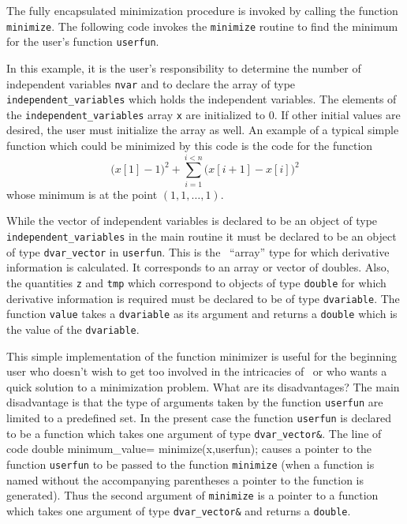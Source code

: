 \documentclass[12pt]{book}
\begin{document}
The fully encapsulated minimization procedure is invoked by calling the
function {\tt minimize}. 
The following code invokes the {\tt minimize} routine
to find the minimum for the user's function {\tt userfun}.
\bigskip
{}

In this example, it is the user's responsibility to determine the
number of independent variables {\tt nvar} and to declare the array
of type {\tt independent\_variables} which holds the independent variables.
 The elements of the
{\tt independent\_variables} array {\tt x} are initialized to 0.  If
other initial values are desired, the user must initialize the
array as well. An example of a typical simple function which could
be minimized by this code is the code for the function
$$\big(x[1]-1\big)^2 + \sum_{i=1}^{i<n} \big(x[i+1]-x[i]\big)^2$$
whose minimum is at the point $(1,1,\ldots,1)$.
\bigbreak
{}

  
While the vector of independent variables is declared
to be an object of type {\tt independent\_variables} in the main 
routine it must be declared to be an object of type {\tt dvar\_vector}
in {\tt userfun}. This is the \AD\  ``array'' type for which
derivative 
information is calculated. It corresponds to an array or vector
of doubles. Also, the quantities {\tt z} and {\tt tmp} which correspond to
objects of type {\tt double} for which derivative information is required
must be declared to be of type {\tt dvariable}. The function {\tt value}
takes a {\tt dvariable} as its argument and returns a {\tt double}
which is the value of the {\tt dvariable}.

This simple implementation of the function minimizer 
is useful for the beginning user who 
doesn't wish to get too involved in the intricacies of \AD\ or
who wants a quick solution to a minimization problem. What are its
disadvantages? 
The main disadvantage is that the type of arguments taken by the function
{\tt userfun} are limited to a predefined set. In the present case the
function {\tt userfun} is declared to be a function which takes
one argument of type {\tt dvar\_vector\&}. The line of code 
\beginexample
double minimum_value= minimize(x,userfun);
\endexample
\noindent causes a pointer to the function {\tt userfun} to be passed
to the function {\tt minimize} (when a function is named without the
accompanying parentheses a pointer to the function is generated).
Thus the second argument of {\tt minimize} is a pointer to
a function which takes one argument of type {\tt dvar\_vector\&}
and returns a {\tt double}.
\end{document}
